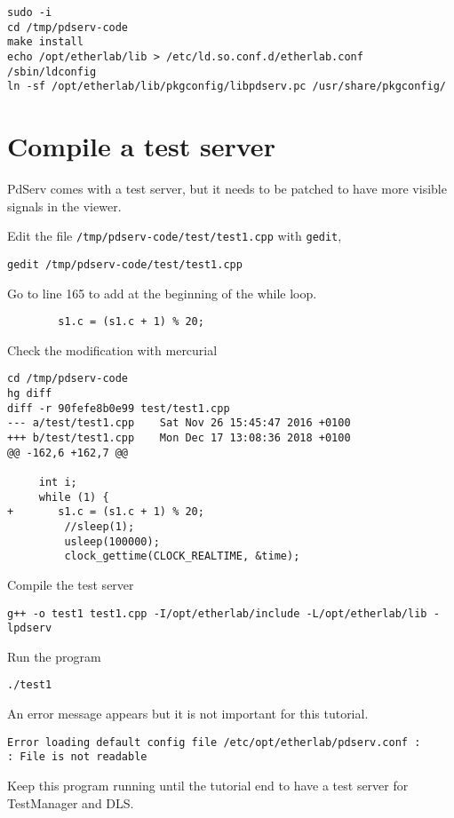 \begin{verbatim}
sudo -i
cd /tmp/pdserv-code
make install
echo /opt/etherlab/lib > /etc/ld.so.conf.d/etherlab.conf
/sbin/ldconfig
ln -sf /opt/etherlab/lib/pkgconfig/libpdserv.pc /usr/share/pkgconfig/
\end{verbatim}


\section{Compile a test server}
\label{test-server-for-testmanager}
PdServ comes with a test server, but it needs to be patched
to have more visible signals in the viewer.

\noindent Edit the file \texttt{/tmp/pdserv-code/test/test1.cpp} with
\texttt{gedit},
\begin{verbatim}
gedit /tmp/pdserv-code/test/test1.cpp
\end{verbatim}

\noindent Go to line 165 to add at the beginning of the while loop.

\begin{verbatim}
        s1.c = (s1.c + 1) % 20;
\end{verbatim}

\noindent Check the modification with mercurial


\begin{verbatim}
cd /tmp/pdserv-code
hg diff
diff -r 90fefe8b0e99 test/test1.cpp
--- a/test/test1.cpp    Sat Nov 26 15:45:47 2016 +0100
+++ b/test/test1.cpp    Mon Dec 17 13:08:36 2018 +0100
@@ -162,6 +162,7 @@

     int i;
     while (1) {
+       s1.c = (s1.c + 1) % 20;
         //sleep(1);
         usleep(100000);
         clock_gettime(CLOCK_REALTIME, &time);
\end{verbatim}

\noindent Compile the test server

\begin{verbatim}
g++ -o test1 test1.cpp -I/opt/etherlab/include -L/opt/etherlab/lib -lpdserv
\end{verbatim}

\noindent Run the program
\begin{verbatim}
./test1
\end{verbatim}

\noindent An error message appears but it is not important for this tutorial.
\begin{verbatim}
Error loading default config file /etc/opt/etherlab/pdserv.conf :
: File is not readable
\end{verbatim}

\noindent Keep this program running until the tutorial end
to have a test server for TestManager and DLS.
